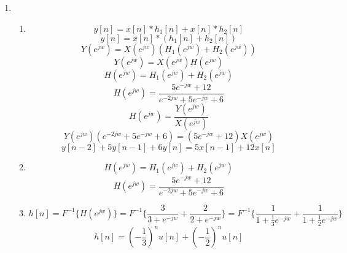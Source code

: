 \documentclass[10pt,a4paper, margin=1in]{article}
\begin{document}
\begin{enumerate}
\item %
    \begin{enumerate}   
    \item %
    \begin{equation}
        y[n] = x[n]*h_1[n] + x[n]*h_2[n]
    \end{equation}
    \begin{equation}
        y[n] = x[n]*(h_1[n]+h_2[n])
    \end{equation}
    \begin{equation}
        Y(e^{jw}) = X(e^{jw})(H_1(e^{jw})+H_2(e^{jw}))
    \end{equation}
    \begin{equation}
        Y(e^{jw}) = X(e^{jw})H(e^{jw})        
    \end{equation}
    \begin{equation}
        H(e^{jw}) = H_1(e^{jw})+H_2(e^{jw})
    \end{equation}
    \begin{equation}
        H(e^{jw}) = \frac{ 5e^{-jw} + 12}{e^{-2jw} + 5e^{-jw} + 6}
    \end{equation}
    \begin{equation}
        H(e^{jw}) = \frac{Y(e^{jw})}{X(e^{jw})}
    \end{equation}
    \begin{equation}
        Y(e^{jw})(e^{-2jw} + 5e^{-jw} + 6) = (5e^{-jw} + 12)X(e^{jw})
    \end{equation}
    \begin{equation}
        y[n-2] + 5y[n-1] + 6y[n] = 5x[n-1] + 12x[n]
    \end{equation}
    \item %
    \begin{equation}
        H(e^{jw}) = H_1(e^{jw})+H_2(e^{jw})
    \end{equation}
    \begin{equation}
        H(e^{jw}) = \frac{ 5e^{-jw} + 12}{e^{-2jw} + 5e^{-jw} + 6}
    \end{equation}
	\item %
    \begin{equation}
        h[n] = F^{-1}\{H(e^{jw})\} = F^{-1}\{\frac{3}{3+e^{-jw}} + \frac{2}{2+e^{-jw}}\} =  F^{-1}\{\frac{1}{1+\frac{1}{3}e^{-jw}} + \frac{1}{1+\frac{1}{2}e^{-jw}}\}
    \end{equation}
    \begin{equation}
        h[n] = (-\frac{1}{3})^nu[n] + (-\frac{1}{2})^nu[n]
    \end{equation}
    \end{enumerate}


\end{enumerate}
\end{document}
